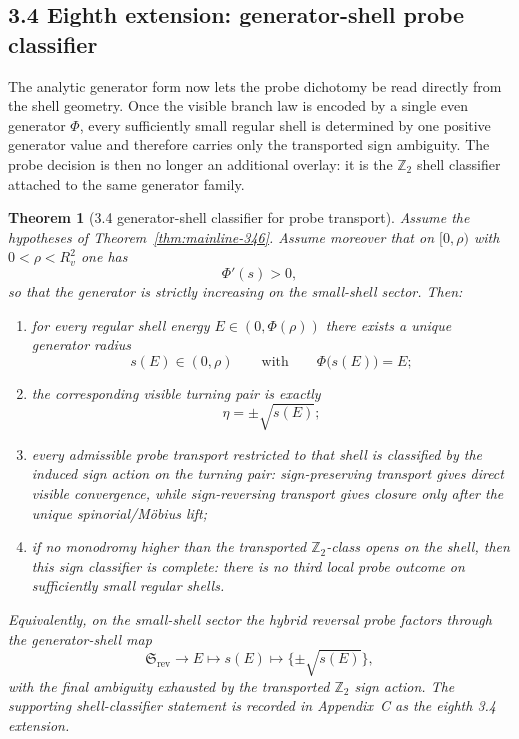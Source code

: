 \documentclass[12pt,a4paper]{article}
\newtheorem{theorem}{Theorem}[section]
\begin{document}
\subsection*{3.4 Eighth extension: generator-shell probe classifier}
The analytic generator form now lets the probe dichotomy be read directly from the shell geometry. Once the visible branch law is encoded by a single even generator $\Phi$, every sufficiently small regular shell is determined by one positive generator value and therefore carries only the transported sign ambiguity. The probe decision is then no longer an additional overlay: it is the $\mathbb Z_2$ shell classifier attached to the same generator family.

\begin{theorem}[3.4 generator-shell classifier for probe transport]
\label{thm:mainline-347}
Assume the hypotheses of Theorem~\ref{thm:mainline-346}. Assume moreover that on $[0,\rho)$ with $0<\rho<R_v^2$ one has
\[
 \Phi'(s)>0,
\]
so that the generator is strictly increasing on the small-shell sector. Then:
\begin{enumerate}[label=(\roman*)]
 \item for every regular shell energy $E\in(0,\Phi(\rho))$ there exists a unique generator radius
 \[
 s(E)\in(0,\rho)
 \qquad\text{with}\qquad
 \Phi\bigl(s(E)\bigr)=E;
 \]
 \item the corresponding visible turning pair is exactly
 \[
 \eta=\pm\sqrt{s(E)};
 \]
 \item every admissible probe transport restricted to that shell is classified by the induced sign action on the turning pair: sign-preserving transport gives direct visible convergence, while sign-reversing transport gives closure only after the unique spinorial/M\"obius lift;
 \item if no monodromy higher than the transported $\mathbb Z_2$-class opens on the shell, then this sign classifier is complete: there is no third local probe outcome on sufficiently small regular shells.
\end{enumerate}
Equivalently, on the small-shell sector the hybrid reversal probe factors through the generator-shell map
\[
 \mathfrak S_{\mathrm{rev}}
 \longrightarrow
 E
 \longmapsto
 s(E)
 \longmapsto
 \{\pm\sqrt{s(E)}\},
\]
with the final ambiguity exhausted by the transported $\mathbb Z_2$ sign action.
The supporting shell-classifier statement is recorded in Appendix~C as the eighth 3.4 extension.
\end{theorem}
\end{document}
